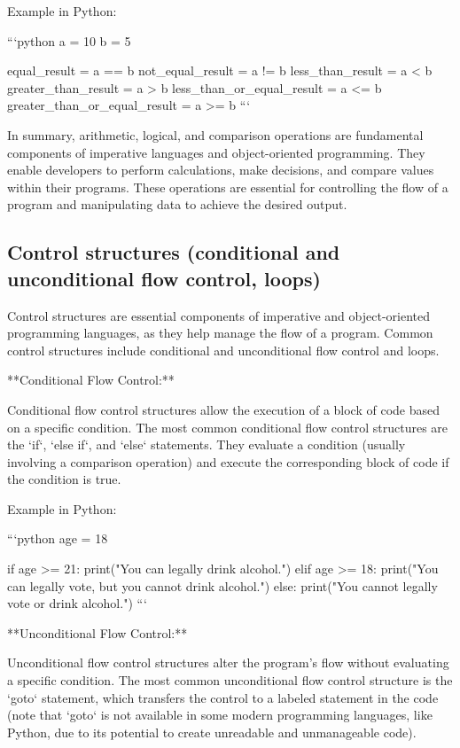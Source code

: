 \documentclass{article}
\begin{document}
Example in Python:

```python
a = 10
b = 5

equal_result = a == b
not_equal_result = a != b
less_than_result = a < b
greater_than_result = a > b
less_than_or_equal_result = a <= b
greater_than_or_equal_result = a >= b
```

In summary, arithmetic, logical, and comparison operations are fundamental components of imperative languages and object-oriented programming. They enable developers to perform calculations, make decisions, and compare values within their programs. These operations are essential for controlling the flow of a program and manipulating data to achieve the desired output.


\subsection{Control structures (conditional and unconditional flow control, loops)}

Control structures are essential components of imperative and object-oriented programming languages, as they help manage the flow of a program. Common control structures include conditional and unconditional flow control and loops.

**Conditional Flow Control:**

Conditional flow control structures allow the execution of a block of code based on a specific condition. The most common conditional flow control structures are the `if`, `else if`, and `else` statements. They evaluate a condition (usually involving a comparison operation) and execute the corresponding block of code if the condition is true.

Example in Python:

```python
age = 18

if age >= 21:
    print("You can legally drink alcohol.")
elif age >= 18:
    print("You can legally vote, but you cannot drink alcohol.")
else:
    print("You cannot legally vote or drink alcohol.")
```

**Unconditional Flow Control:**

Unconditional flow control structures alter the program's flow without evaluating a specific condition. The most common unconditional flow control structure is the `goto` statement, which transfers the control to a labeled statement in the code (note that `goto` is not available in some modern programming languages, like Python, due to its potential to create unreadable and unmanageable code).
\end{document}
